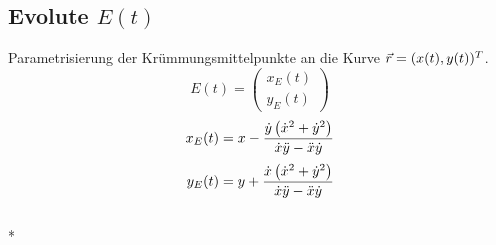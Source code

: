 \subsection{Evolute \texorpdfstring{\hfill $E(t)$}{E(t)}}
    Parametrisierung der Krümmungsmittelpunkte an die Kurve $\vec{r} = (x(t), y(t))^T$.
    $$
        E(t) = 
        \begin{pmatrix}
            x_E(t)\\y_E(t)
        \end{pmatrix}
    $$
    \begin{align*}
        x_E(t) &= x - \frac{\dot{y} \left( \dot{x}^2 + \dot{y}^2 \right)}{\dot{x} \ddot{y} - \ddot{x} \dot{y}}\\[0.25em]
        y_E(t) &= y + \frac{\dot{x} \left( \dot{x}^2 + \dot{y}^2 \right)}{\dot{x} \ddot{y} - \ddot{x} \dot{y}}
    \end{align*}
    \\*